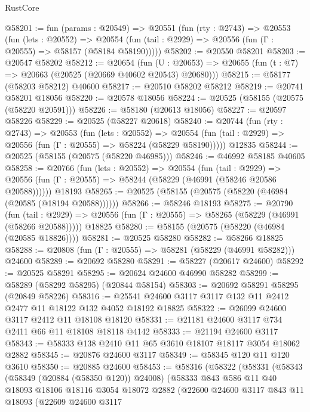 \begin{lexlean}{RustCore}
\begin{coremodule}
@58201 := fun (params : @20549) =>
  @20551
    (fun (rty : @2743) =>
    @20553
      (fun (lets : @20552) =>
      @20554 (fun (tail : @2929) => @20556 (fun (Γ : @20555) => @58157 (@58184 @58190)))))
@58202 := @20550 @58201
@58203 := @20547 @58202
@58212 := @20654
    (fun (U : @20653) => @20655 (fun (t : @7) => @20663 (@20525 (@20669 @40602 @20543) @20680)))
@58215 := @58177 (@58203 @58212) @40600
@58217 := @20510 @58202 @58212
@58219 := @20741 @58201 @18056
@58220 := @20578 @18056
@58224 := @20525 (@58155 (@20575 (@58220 @20591)))
@58226 := @58180 (@20613 @18056)
@58227 := @20597 @58226
@58229 := @20525 (@58227 @20618)
@58240 := @20744
    (fun (rty : @2743) =>
    @20553
      (fun (lets : @20552) =>
      @20554 (fun (tail : @2929) => @20556 (fun (Γ : @20555) => @58224 (@58229 @58190)))))
    @12835
@58244 := @20525 (@58155 (@20575 (@58220 @46985)))
@58246 := @46992 @58185 @40605
@58258 := @20766
    (fun (lets : @20552) =>
    @20554
      (fun (tail : @2929) =>
      @20556 (fun (Γ : @20555) => @58244 (@58229 (@46991 (@58246 @20586 @20588))))))
    @18193
@58265 := @20525 (@58155 (@20575 (@58220 (@46984 (@20585 (@18194 @20588))))))
@58266 := @58246 @18193
@58275 := @20790
    (fun (tail : @2929) => @20556 (fun (Γ : @20555) => @58265 (@58229 (@46991 (@58266 @20588)))))
    @18825
@58280 := @58155 (@20575 (@58220 (@46984 (@20585 @18826))))
@58281 := @20525 @58280
@58282 := @58266 @18825
@58288 := @20808 (fun (Γ : @20555) => @58281 (@58229 (@46991 @58282))) @24600
@58289 := @20692 @58280
@58291 := @58227 (@20617 @24600)
@58292 := @20525 @58291
@58295 := @20624 @24600 @46990 @58282
@58299 := @58289 (@58292 @58295) (@20844 @58154)
@58303 := @20692 @58291 @58295 (@20849 @58226)
@58316 := @25541 @24600 @3117 @3117 @132 @11 @2412 @2477 @11 @18122 @132 @4052 @18192 @18825
@58322 := @26099 @24600 @3117 @2412 @11 @18108 @18120
@58331 := @21181 @24600 @3117 @734 @2411 @66 @11 @18108 @18118 @4142
@58333 := @21194 @24600 @3117
@58343 := @58333 @138 @2410 @11 @65 @3610 @18107 @18117 @3054 @18062 @2882
@58345 := @20876 @24600 @3117
@58349 := @58345 @120 @11 @120 @3610
@58350 := @20885 @24600
@58453 := @58316
    (@58322
      (@58331
        (@58343
          (@58349 (@20884 (@58350 @120)) @24008)
          (@58333
            @843
            @586
            @11
            @40
            @18093
            @18106
            @18116
            @3054
            @18072
            @2882
            (@22600
              @24600
              @3117
              @843
              @11
              @18093
              (@22609
                @24600
                @3117

\end{coremodule}
\end{lexlean}
